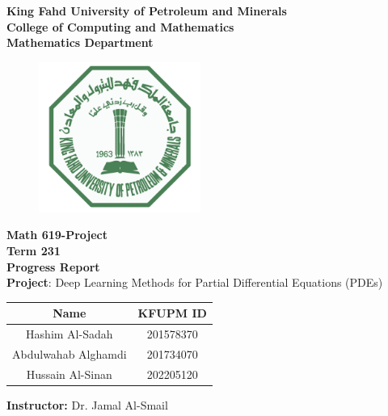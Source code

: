 \graphicspath{{./images}}

\begin{center}
    \doublespacing
    {\Large \textbf{King Fahd University of Petroleum and Minerals} }\\ 
    {\large \textbf{
    College of Computing and Mathematics\\
    Mathematics Department 
    } } 
\end{center} 

\begin{figure}[h]
    \centering
    \includegraphics[width=200px]{KFUPM_LOGO}
\end{figure}

\begin{center}\onehalfspacing
    \Large \textbf{Math 619-Project}\\
    \normalsize \textbf{Term 231} \\
    \Large \textbf{Progress Report}\\
    \textbf{Project}: Deep Learning Methods for Partial Differential Equations (PDEs)
\end{center}
\vspace{1em}
\large
\begin{center}
\bgroup
\def\arraystretch{1.3}
\begin{tabular}{|c|c|}
    \hline
    \textbf{Name} & \textbf{KFUPM ID} \\
    \hline
    Hashim Al-Sadah & 201578370\\
    \hline
    Abdulwahab Alghamdi & 201734070\\
    \hline
    Hussain Al-Sinan & 202205120\\
    \hline 
\end{tabular}
\egroup
\end{center}
\vspace{1em}
\begin{center}
    \textbf{Instructor:} Dr. Jamal Al-Smail
\end{center}
\normalsize

